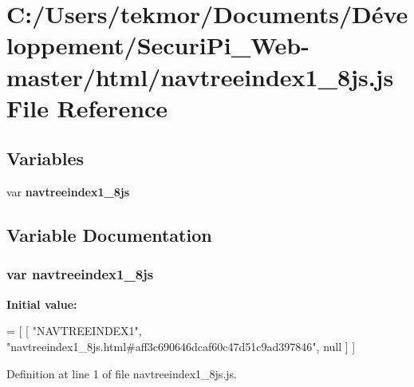 \section{C\+:/\+Users/tekmor/\+Documents/\+Développement/\+Securi\+Pi\+\_\+\+Web-\/master/html/navtreeindex1\+\_\+8js.js File Reference}
\label{navtreeindex1__8js_8js}
\subsection*{Variables}
\begin{DoxyCompactItemize}
\item 
var {\bf navtreeindex1\+\_\+8js}
\end{DoxyCompactItemize}


\subsection{Variable Documentation}
\subsubsection[{navtreeindex1\+\_\+8js}]{\setlength{\rightskip}{0pt plus 5cm}var navtreeindex1\+\_\+8js}\label{navtreeindex1__8js_8js_a2b964e0be4e3b38198402f1372045abf}
{\bfseries Initial value\+:}
\begin{DoxyCode}
=
[
    [ \textcolor{stringliteral}{"NAVTREEINDEX1"}, \textcolor{stringliteral}{"navtreeindex1\_8js.html#aff3c690646dcaf60c47d51c9ad397846"}, null ]
]
\end{DoxyCode}


Definition at line 1 of file navtreeindex1\+\_\+8js.\+js.

